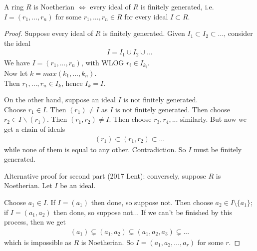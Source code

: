 \documentclass[a4paper]{article}
\begin{document}
\begin{prop}
A ring $R$ is Noetherian $\iff$ every ideal of $R$ is finitely generated, i.e. $I=\left(r_1,...,r_n\right)$ for some $r_1,...,r_n\in R$ for every ideal $I \subset R$.
\begin{proof}
Suppose every ideal of $R$ is finitely generated. Given $I_1 \subset I_2 \subset ...$, consider the ideal
\begin{equation*}
\begin{aligned}
I = I_1 \cup I_2 \cup ...
\end{aligned}
\end{equation*}
We have $I=\left(r_1,...,r_n\right)$, with WLOG $r_i \in I_{k_i}$.\\
Now let $k=max\left(k_1,...,k_n\right)$.\\
Then $r_1,...,r_n\in I_k$,  hence $I_k = I$.

On the other hand, suppose an ideal $I$ is not finitely generated.\\
Choose $r_1 \in I$. Then $\left(r_1\right) \neq I$ as $I$ is not finitely generated. Then choose $r_2 \in I\backslash \left(r_1\right)$. Then $\left(r_1,r_2\right)\neq I$. Then choose $r_3,r_4,...$ similarly. But now we get a chain of ideals
\begin{equation*}
\begin{aligned}
\left(r_1\right) \subset \left(r_1,r_2\right) \subset ...
\end{aligned}
\end{equation*}
while none of them is equal to any other. Contradiction. So $I$ must be finitely generated.

Alternative proof for second part (2017 Lent): conversely, suppose $R$ is Noetherian. Let $I$ be an ideal.

Choose $a_1 \in I$. If $I=(a_1)$ then done, so suppose not. Then choose $a_2 \in I \setminus\{a_1\}$; if $I=(a_1,a_2)$ then done, so suppose not... If we can't be finished by this process, then we get
\begin{equation*}
\begin{aligned}
(a_1) \subsetneq (a_1,a_2) \subsetneq (a_1,a_2,a_3) \subsetneq ...
\end{aligned}
\end{equation*}
which is impossible as $R$ is Noetherian. So $I=(a_1,a_2,...,a_r)$ for some $r$.
\end{proof}
\end{prop}
\end{document}
